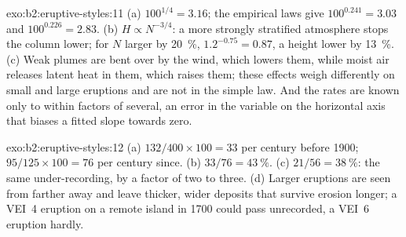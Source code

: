 \begin{solution}{exo:b2:eruptive-styles:11}
(a) $100^{1/4} = 3.16$; the empirical laws give $100^{0.241} = 3.03$ and
$100^{0.226} = 2.83$. (b) $H \propto N^{-3/4}$: a more strongly stratified
atmosphere stops the column lower; for $N$ larger by \qty{20}{\percent},
$1.2^{-0.75} = 0.87$, a height lower by \qty{13}{\percent}. (c) Weak plumes are
bent over by the wind, which lowers them, while moist air releases latent heat in
them, which raises them; these effects weigh differently on small and large
eruptions and are not in the simple law. And the rates are known only to within
factors of several, an error in the variable on the horizontal axis that biases
a fitted slope towards zero.
\end{solution}

\begin{solution}{exo:b2:eruptive-styles:12}
(a) $132/400\times100 = 33$ per century before 1900; $95/125\times100 = 76$ per
century since. (b) $33/76 = \qty{43}{\percent}$. (c) $21/56 = \qty{38}{\percent}$:
the same under-recording, by a factor of two to three. (d) Larger eruptions are
seen from farther away and leave thicker, wider deposits that survive erosion
longer; a VEI~4 eruption on a remote island in 1700 could pass unrecorded, a
VEI~6 eruption hardly.
\end{solution}

